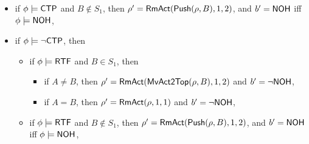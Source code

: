 {\begin{itemize}
\begin{itemize}
\begin{itemize}
\begin{itemize}
\begin{itemize}
\begin{itemize}
            				\item if $A \neq B$, then $\rho'=\clrtop(\rho, B)$, moreover, 
					\begin{itemize}
						\item if $\phi\models \neg \stpflag$, then $b' = \nohflag$ iff $\phi \models \nohflag$, 
						\item otherwise, $b' = \neg \nohflag$, 
					\end{itemize}
					\item if $A = B$, 
					\begin{itemize}
						\item if $\phi \models \neg \stpflag$, then $\rho' = \clrtop(\rho, B)$, and $b' = \nohflag$ iff $\phi \models \nohflag$, 
						\item otherwise, $\rho' = \rmact(\rho, 1, 1)$ and $b' = \neg\nohflag$,
					\end{itemize}
				\end{itemize}
				\item if $\phi \models {\sf CTP}$ and $B\notin S_1$, then $\rho' = \mathsf{RmAct}(\mathsf{Push}(\rho, B), 1, 2)$, and $b' = \nohflag$ iff $\phi \models \nohflag$, 
				\item if $\phi \models \neg {\sf CTP}$, then
				\begin{itemize}
					\item if $\phi \models {\sf RTF}$ and $B \in S_1$, then
					\begin{itemize}
                					\item if $A \neq B$, then $\rho' = \mathsf{RmAct}(\mathsf{MvAct2Top}(\rho, B), 1, 2)$ and $b' = \neg \nohflag$, 
                					\item if $A = B$, then $\rho' = \rmact(\rho, 1, 1)$ and $b' = \neg\nohflag$,
                				\end{itemize}
					\item if $\phi \models {\sf RTF}$ and $B \notin S_1$, then $\rho' = \mathsf{RmAct}(\mathsf{Push}(\rho, B), 1, 2)$, and $b' = \nohflag$ iff $\phi \models \nohflag$, 

\end{itemize}
\end{itemize}
\end{itemize}
\end{itemize}
\end{itemize}
\end{itemize}}
